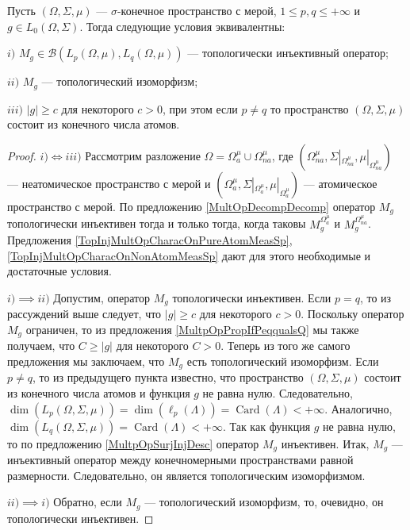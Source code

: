 \begin{proposition}\label{TopInjMultOpCharacOnMeasSp} Пусть $(\Omega,\Sigma,\mu)$ --- $\sigma$-конечное пространство с мерой, $1\leq p,q\leq +\infty$ и $g\in L_0(\Omega,\Sigma)$. Тогда следующие условия эквивалентны:

$i)$ $M_g\in\mathcal{B}(L_p(\Omega,\mu),L_q(\Omega,\mu))$ --- топологически инъективный оператор;

$ii)$ $M_g$ --- топологический изоморфизм;

$iii)$ $|g|\geq c$ для некоторого $c>0$, при этом если $p\neq q$ то пространство $(\Omega,\Sigma,\mu)$ состоит из конечного числа атомов.
\end{proposition}
\begin{proof} $i)\Longleftrightarrow iii)$ Рассмотрим разложение
$\Omega=\Omega_a^{\mu}\cup\Omega_{na}^{\mu}$, где $(\Omega_{na}^{\mu},\Sigma|_{\Omega_{na}^{\mu}},\mu|_{\Omega_{na}^{\mu}})$ --- неатомическое пространство с мерой и $(\Omega_a^{\mu},\Sigma|_{\Omega_a^{\mu}},\mu|_{\Omega_a^{\mu}})$ --- атомическое пространство с мерой. По предложению \ref{MultOpDecompDecomp} оператор $M_g$ топологически инъективен тогда и только тогда, когда таковы $M_g^{\Omega_a^{\mu}}$ и $M_g^{\Omega_{na}^{\mu}}$. Предложения \ref{TopInjMultOpCharacOnPureAtomMeasSp}, \ref{TopInjMultOpCharacOnNonAtomMeasSp} дают для этого необходимые и достаточные условия.

$i)$$\implies$$ ii)$ Допустим, оператор $M_g$ топологически инъективен. Если $p=q$, то из рассуждений выше следует, что $|g|\geq c$ для некоторого $c>0$. Поскольку оператор $M_g$ ограничен, то из предложения \ref{MultpOpPropIfPeqqualsQ} мы также получаем, что $C\geq |g|$ для некоторого $C>0$. Теперь из того же самого предложения мы заключаем, что $M_g$ есть топологический изоморфизм. Если $p\neq q$, то из предыдущего пункта известно, что пространство $(\Omega,\Sigma,\mu)$ состоит из конечного числа атомов и функция $g$ не равна нулю. Следовательно, $\operatorname{dim}(L_p(\Omega,\Sigma,\mu))=\operatorname{dim}(\ell_p(\Lambda))=\operatorname{Card}(\Lambda)<+\infty$. Аналогично, $\operatorname{dim}(L_q(\Omega,\Sigma,\mu))=\operatorname{Card}(\Lambda)<+\infty$. Так как функция $g$ не равна нулю, то по предложению \ref{MultpOpSurjInjDesc} оператор $M_g$ инъективен. Итак, $M_g$ --- инъективный оператор между конечномерными пространствами равной размерности. Следовательно, он является  топологическим изоморфизмом.

$ii)$$\implies$$ i)$ Обратно, если $M_g$ --- топологический изоморфизм, то, очевидно, он топологически инъективен.
\end{proof}

